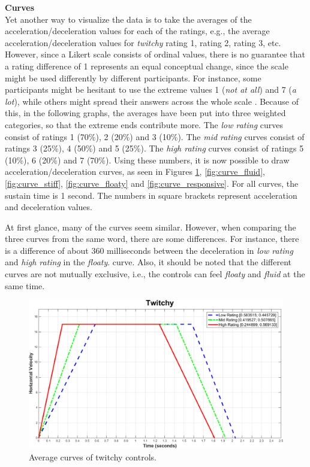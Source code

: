 \textbf{Curves}\\
Yet another way to visualize the data is to take the averages of the acceleration/deceleration values for each of the ratings, e.g., the average acceleration/deceleration values for \textit{twitchy} rating 1, rating 2, rating 3, etc. However, since a Likert scale consists of ordinal values, there is no guarantee that a rating difference of 1 represents an equal conceptual change, since the scale might be used differently by different participants. For instance, some participants might be hesitant to use the extreme values 1 (\textit{not at all}) and 7 (\textit{a lot}), while others might spread their answers across the whole scale \cite{cunningham}. Because of this, in the following graphs, the averages have been put into three weighted categories, so that the extreme ends contribute more. The \textit{low rating} curves consist of ratings 1 (70\%), 2 (20\%) and 3 (10\%). The \textit{mid rating} curves consist of ratings 3 (25\%), 4 (50\%) and 5 (25\%). The \textit{high rating} curves consist of ratings 5 (10\%), 6 (20\%) and 7 (70\%). Using these numbers, it is now possible to draw acceleration/deceleration curves, as seen in Figures \ref{fig:curve_twitchy}, \ref{fig:curve_fluid}, \ref{fig:curve_stiff}, \ref{fig:curve_floaty} and \ref{fig:curve_responsive}. For all curves, the sustain time is 1 second. The numbers in square brackets represent acceleration and deceleration values.

At first glance, many of the curves seem similar. However, when comparing the three curves from the same word, there are some differences. For instance, there is a difference of about 360 milliseconds between the deceleration in \textit{low rating} and \textit{high rating} in the \textit{floaty}. curve. Also, it should be noted that the different curves are not mutually exclusive, i.e., the controls can feel \textit{floaty} and \textit{fluid} at the same time.

\begin{figure}[htbp]
\centering
\includegraphics[width=0.9\columnwidth]{Pics/Curves/Twitchy_curve}
\caption{Average curves of twitchy controls.}
\label{fig:curve_twitchy}
\end{figure}

